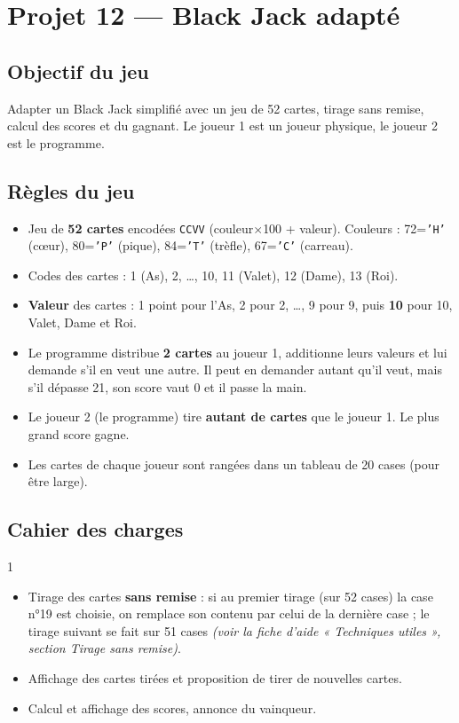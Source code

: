 \section{Projet 12 — Black Jack adapté}

\subsection*{Objectif du jeu}
Adapter un Black Jack simplifié avec un jeu de 52 cartes, tirage sans remise, calcul des scores et du gagnant. Le joueur 1 est un joueur physique, le joueur 2 est le programme.

\subsection*{Règles du jeu}
\begin{itemize}
  \item Jeu de \textbf{52 cartes} encodées \texttt{CCVV} (couleur$\times$100 + valeur). Couleurs : 72=\texttt{'H'} (c\oe{}ur), 80=\texttt{'P'} (pique), 84=\texttt{'T'} (trèfle), 67=\texttt{'C'} (carreau).
  \item Codes des cartes : 1 (As), 2, \ldots, 10, 11 (Valet), 12 (Dame), 13 (Roi).
  \item \textbf{Valeur} des cartes : 1 point pour l'As, 2 pour 2, \ldots, 9 pour 9, puis \textbf{10} pour 10, Valet, Dame et Roi.
  \item Le programme distribue \textbf{2 cartes} au joueur 1, additionne leurs valeurs et lui demande s'il en veut une autre. Il peut en demander autant qu'il veut, mais s'il dépasse 21, son score vaut 0 et il passe la main.
  \item Le joueur 2 (le programme) tire \textbf{autant de cartes} que le joueur 1. Le plus grand score gagne.
  \item Les cartes de chaque joueur sont rangées dans un tableau de 20 cases (pour être large).
\end{itemize}

\subsection*{Cahier des charges}
\begin{UPSTICahierDesCharges}{1}
\begin{itemize}
  \item Tirage des cartes \textbf{sans remise} : si au premier tirage (sur 52 cases) la case n°19 est choisie, on remplace son contenu par celui de la dernière case ; le tirage suivant se fait sur 51 cases \textit{(voir la fiche d'aide « Techniques utiles », section Tirage sans remise)}.
  \item Affichage des cartes tirées et proposition de tirer de nouvelles cartes.
  \item Calcul et affichage des scores, annonce du vainqueur.
\end{itemize}
\end{UPSTICahierDesCharges}

